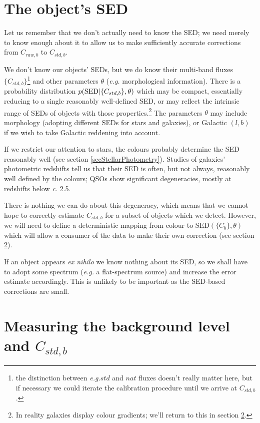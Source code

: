 \documentclass[12pt]{article}
\renewcommand{\c}{\textit{c.}\xspace}
\newcommand{\eg}{\textit{e.g.}\xspace}
\begin{document}
\section{The object's SED}
\label{secSED}

Let us remember that we don't actually need to know the SED; we need merely to know enough about it to allow
us to make sufficiently accurate corrections from $C_{raw, b}$ to $C_{std, b}$.

We don't know our objects' SEDs, but we do know their multi-band fluxes $\{C_{std,b}\}$\footnote{
  the distinction between \eg $std$ and $nat$ fluxes doesn't really matter here,  but if necessary
  we could iterate the calibration procedure until we arrive at $C_{std, b}$.
  }
and other parameters
$\theta$ (\eg morphological information).  There is a probability distribution
$p({\rm SED}|\{C_{std, b}\}, \theta)$ which
may be compact, essentially reducing to a single reasonably well-defined SED, or may reflect the intrinsic
range of SEDs of objects with those properties.\footnote{
  In reality galaxies display colour gradients; we'll return to this in section \ref{secMeasuring}.
}
The parameters $\theta$ may include morphology (adopting different SEDs for stars and galaxies), or
Galactic $(l, b)$ if we wish to take Galactic reddening into account.

If we restrict our attention to stars, the colours probably determine the SED reasonably well (see
section \ref{secStellarPhotometry}).  Studies of galaxies' photometric redshifts tell us that their SED is
often, but not always, reasonably well defined by the colours; QSOs show significant degeneracies, mostly
at redshifts below \c 2.5.

There is nothing we can do about this degeneracy, which means that we cannot hope to correctly estimate
$C_{std, b}$ for a subset of objects which we detect.  However, we will need to define a deterministic mapping
from colour to $\mbox{SED}(\{C_b\}, \theta)$ which will allow a consumer of the data to make their own
correction (see section \ref{secMeasuring}).

If an object appears \textit{ex nihilo} we know nothing about its SED, so we shall have to adopt
some spectrum (\eg a flat-spectrum source) and increase the error estimate accordingly.  This is unlikely
to be important as the SED-based corrections are small.

\section{Measuring the background level and \texorpdfstring{$C_{std, b}$}{Cstd}}
\label{secMeasuring}
\end{document}
